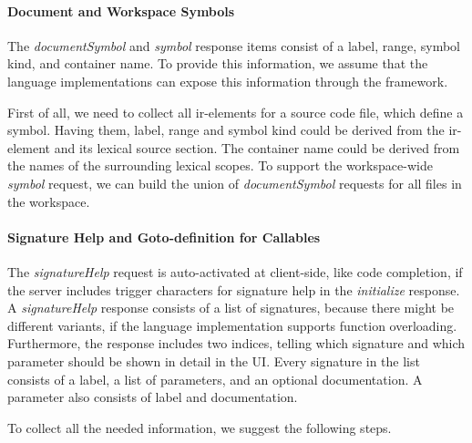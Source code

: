 \documentclass[sigplan,10pt,review,anonymous]{acmart}
\begin{document}



    \paragraph{Document and Workspace Symbols}
    The \emph{documentSymbol} and \emph{symbol} response items consist of a label, range, symbol kind, and container name. To provide this information, we assume that the language implementations can expose this information through the framework.

    First of all, we need to collect all \ac{ir}-elements for a source code file, which define a symbol. Having them, label, range and symbol kind could be derived from the \ac{ir}-element and its lexical source section. The container name could be derived from the names of the surrounding lexical scopes. To support the workspace-wide \emph{symbol} request, we can build the union of \emph{documentSymbol} requests for all files in the workspace.

    \paragraph{Signature Help and Goto-definition for Callables}
    The \emph{signatureHelp} request is auto-activated at client-side, like code completion, if the server includes trigger characters for signature help in the \emph{initialize} response. A \emph{signatureHelp} response consists of a list of signatures, because there might be different variants, if the language implementation supports function overloading. Furthermore, the response includes two indices, telling which signature and which parameter should be shown in detail in the UI. Every signature in the list consists of a label, a list of parameters, and an optional documentation. A parameter also consists of label and documentation.

    To collect all the needed information, we suggest the following steps.
\end{document}
